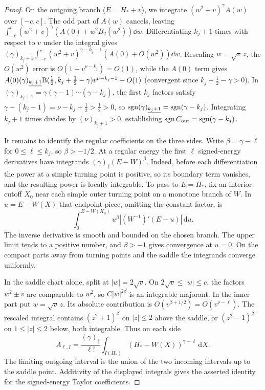 \begin{proof}
On the outgoing branch ($E=H_*+v$), we integrate $(w^2+v)^\gamma A(w)$ over $[-c,c]$. The odd part of $A(w)$ cancels, leaving $\int_{-c}^c (w^2+v)^\gamma(A(0)+w^2 B_2(w^2))\dd w$. Differentiating $k_j+1$ times with respect to $v$ under the integral gives $(\gamma)_{\underline{k_j+1}}\int_{-c}^c (w^2+v)^{\gamma-k_j-1}(A(0)+O(w^2))\dd w$. Rescaling $w=\sqrt{v}\,z$, the $O(w^2)$ error is $O(1+v^{\nu-k_j})=O(1)$, while the $A(0)$ term gives $A(0)(\gamma)_{\underline{k_j+1}}\mathrm{B}(\tfrac{1}{2},k_j+\tfrac{1}{2}-\gamma)v^{\nu-k_j-1}+O(1)$ (convergent since $k_j+\frac{1}{2}-\gamma>0$). In $(\gamma)_{\underline{k_j+1}}=\gamma(\gamma-1)\cdots(\gamma-k_j)$, the first $k_j$ factors satisfy $\gamma-(k_j-1)=\nu-k_j+\frac{1}{2}>\frac{1}{2}>0$, so $\operatorname{sgn}(\gamma)_{\underline{k_j+1}}=\operatorname{sgn}(\gamma-k_j)$. Integrating $k_j+1$ times divides by $(\nu)_{\underline{k_j+1}}>0$, establishing $\operatorname{sgn} C_{\mathrm{out}}=\operatorname{sgn}(\gamma-k_j)$.

It remains to identify the regular coefficients on the three sides. Write \(\beta=\gamma-\ell\) for \(0\le\ell\le k_j\), so \(\beta>-1/2\). At a regular energy the first \(\ell\) signed-energy derivatives have integrands \((\gamma)_{\underline{\ell}}(E-W)^\beta\). Indeed, before each differentiation the power at a simple turning point is positive, so its boundary term vanishes, and the resulting power is locally integrable. To pass to \(E=H_*\), fix an interior cutoff \(X_0\) near each simple outer turning point on a monotone branch of \(W\). In \(u=E-W(X)\) that endpoint piece, omitting the constant factor, is
\[
  \int_0^{E-W(X_0)} u^\beta
     \left|(W^{-1})'(E-u)\right|\,\mathrm du .
\]
The inverse derivative is smooth and bounded on the chosen branch. The upper limit tends to a positive number, and \(\beta>-1\) gives convergence at \(u=0\). On the compact parts away from turning points and the saddle the integrands converge uniformly.

In the saddle chart alone, split at \(|w|=2\sqrt v\). On \(2\sqrt v\le |w|\le c\), the factors \(w^2\pm v\) are comparable to \(w^2\), so \(C|w|^{2\beta}\) is an integrable majorant. In the inner part put \(w=\sqrt v\,z\). Its absolute contribution is \(O(v^{\beta+1/2})=O(v^{\nu-\ell})\). The rescaled integral contains \((z^2+1)^\beta\) on \(|z|\le2\) above the saddle, or \((z^2-1)^\beta\) on \(1\le|z|\le2\) below, both integrable. Thus on each side
\[
 A_{\ell,I}=\frac{(\gamma)_{\underline{\ell}}}{\ell!}
      \int_{I(H_*)}(H_*-W(X))^{\gamma-\ell}\,\mathrm dX .
\]
The limiting outgoing interval is the union of the two incoming intervals up to the saddle point. Additivity of the displayed integrals gives the asserted identity for the signed-energy Taylor coefficients.
\end{proof}

